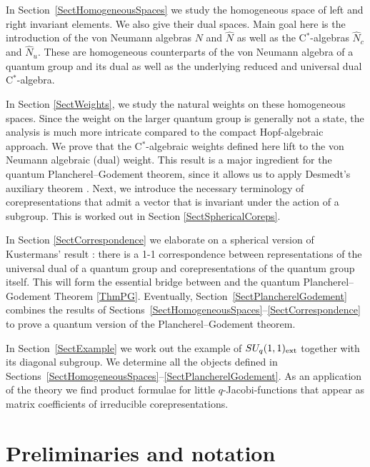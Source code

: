 \documentclass[pdftex]{sigma}
\numberwithin{equation}{section}
\theoremstyle{definition}
\begin{document}
In Section~\ref{SectHomogeneousSpaces} we study the homogeneous space of left and right invariant elements. We also give their dual spaces. Main goal here is the introduction of the von Neumann algebras $N$ and $\hat{N}$ as well as the C$^\ast$-algebras $\hat{N}_c$ and $\hat{N}_u$. These are homogeneous counterparts of the von Neumann algebra of a quantum group and its dual as well as the underlying reduced and universal dual C$^\ast$-algebra.

 In Section \ref{SectWeights}, we study the natural weights on these homogeneous spaces. Since the weight on the larger quantum group is generally not a state, the analysis is much more intricate compared to the compact Hopf-algebraic approach. We prove that the C$^\ast$-algebraic weights def\/ined here lift to the von Neumann algebraic (dual) weight. This result is a major ingredient for the quantum Plancherel--Godement theorem, since it allows us to apply Desmedt's auxiliary theorem \cite[Theorem~3.4.5]{Des}.
 Next, we introduce the necessary terminology of corepresentations that admit a vector that is invariant under the action of a subgroup. This is worked out in Section \ref{SectSphericalCoreps}.

In Section \ref{SectCorrespondence} we elaborate on a spherical version of Kustermans' result \cite{Kus}: there is a 1-1 correspondence between representations of the universal dual of a quantum group and corepresentations of the quantum group itself.  This will form the essential bridge between  \cite[Theorem~3.4.5]{Des} and the quantum Plancherel--Godement  Theorem \ref{ThmPG}.
Eventually, Section~\ref{SectPlancherelGodement} combines the results of Sections~\ref{SectHomogeneousSpaces}--\ref{SectCorrespondence} to prove a quantum version of the Plancherel--Godement theorem.


In Section~\ref{SectExample} we work out the example of $SU_q(1,1)_{\rm ext}$  together with its diagonal subgroup. We determine all the objects def\/ined in Sections~\ref{SectHomogeneousSpaces}--\ref{SectPlancherelGodement}. As an application of the theory we f\/ind product formulae for little $q$-Jacobi-functions that appear as matrix coef\/f\/icients of irreducible corepresentations.

\vspace{-1mm}

\section{Preliminaries and notation}\label{SectPreliminaries}
\end{document}
